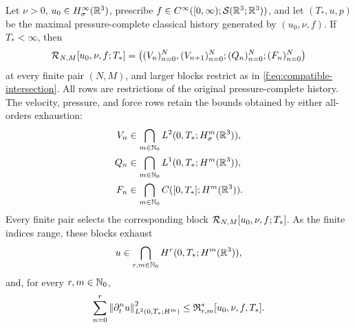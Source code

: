 \begin{theorem}
\label{f:thm:compatible-inverse-intersection}

Let \(\nu>0\), \(u_0\in H^\infty_\sigma(\mathbb R^3)\), prescribe
\(f\in C^\infty([0,\infty);\mathcal S(\mathbb R^3;\mathbb R^3))\), and let
\((T_*,u,p)\) be the maximal pressure-complete classical history generated
by \((u_0,\nu,f)\). If \(T_*<\infty\), then
\begin{equation}
 \mathcal R_{N,M}[u_0,\nu,f;T_*]
 =\left((V_n)_{n=0}^{N},(V_{n+1})_{n=0}^{N};
 (Q_n)_{n=0}^{N};(F_n)_{n=0}^{N}\right)
 \label{f:eq:ier-compatible-family}
\end{equation}
at every finite pair \((N,M)\), and larger blocks restrict as in
\eqref{f:eq:compatible-intersection}.  All rows are restrictions of the
original pressure-complete history.  The velocity, pressure, and force rows
retain the bounds obtained by either all-orders exhaustion:
\begin{align}
 V_n&\in\bigcap_{m\in\mathbb N_0}L^2(0,T_*;H^m_\sigma(\mathbb R^3)),
 \label{f:eq:ier-inverse-velocity-coordinate}\\
 Q_n&\in\bigcap_{m\in\mathbb N_0}L^1(0,T_*;H^m(\mathbb R^3)),
 \label{f:eq:ier-inverse-pressure-coordinate}\\
 F_n&\in\bigcap_{m\in\mathbb N_0}C([0,T_*];H^m(\mathbb R^3)).
 \label{f:eq:ier-inverse-force-coordinate}
\end{align}
Every finite pair selects the corresponding block
\(\mathcal R_{N,M}[u_0,\nu,f;T_*]\).  As the finite indices range, these blocks
exhaust
\begin{equation}
 u\in\bigcap_{r,m\in\mathbb N_0}H^r(0,T_*;H^m(\mathbb R^3)),
 \label{f:eq:mixed-sobolev-intersection}
\end{equation}
and, for every \(r,m\in\mathbb N_0\),
\begin{equation}
 \sum_{n=0}^{r}\left\lVert \partial_t^nu\right\rVert_{L^2(0,T_*;H^m)}^2
 \le\mathfrak R_{r,m}^*[u_0,\nu,f,T_*].
 \label{f:eq:mixed-sobolev-finite-bound}
\end{equation}
\end{theorem}

